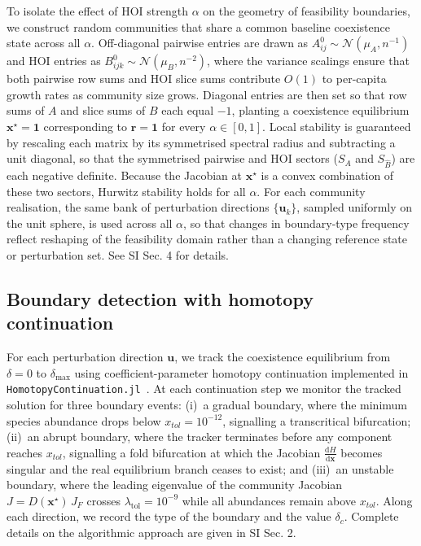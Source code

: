 \documentclass[
 reprint,
 amsmath,
 amssymb,
 aps,
 superscriptaddress,
]{revtex4-2}
\begin{document}
To isolate the effect of HOI strength $\alpha$ on the geometry of feasibility boundaries, we construct random communities that share a common baseline coexistence state across all $\alpha$. Off-diagonal pairwise entries are drawn as $A^0_{ij} \sim \mathcal{N}(\mu_A, n^{-1})$ and HOI entries as $B^0_{ijk} \sim \mathcal{N}(\mu_B, n^{-2})$, where the variance scalings ensure that both pairwise row sums and HOI slice sums contribute $O(1)$ to per-capita growth rates as community size grows. Diagonal entries are then set so that row sums of $A$ and slice sums of $B$ each equal $-1$, planting a coexistence equilibrium $\mathbf{x}^\star = \mathbf{1}$ corresponding to $\mathbf{r} = \mathbf{1}$ for every $\alpha \in [0,1]$. Local stability is guaranteed by rescaling each matrix by its symmetrised spectral radius and subtracting a unit diagonal, so that the symmetrised pairwise and HOI sectors ($S_A$ and $S_{\hat{B}}$) are each negative definite. Because the Jacobian at $\mathbf{x}^\star$ is a convex combination of these two sectors, Hurwitz stability holds for all $\alpha$. For each community realisation, the same bank of perturbation directions $\{\mathbf{u}_k\}$, sampled uniformly on the unit sphere, is used across all $\alpha$, so that changes in boundary-type frequency reflect reshaping of the feasibility domain rather than a changing reference state or perturbation set. See SI Sec. 4 for details.

\subsection*{Boundary detection with homotopy continuation}

For each perturbation direction $\mathbf{u}$, we track the coexistence equilibrium from $\delta = 0$ to $\delta_{\max}$ using coefficient-parameter homotopy continuation implemented in \texttt{HomotopyContinuation.jl}~\cite{breiding_homotopycontinuationjl_2018}. At each continuation step we monitor the tracked solution for three boundary events: (i)~a gradual boundary, where the minimum species abundance drops below $x_{tol} = 10^{-12}$, signalling a transcritical bifurcation; (ii)~an abrupt boundary, where the tracker terminates before any component reaches $x_{tol}$, signalling a fold bifurcation at which the Jacobian $\frac{\mathrm{d}H}{\mathrm{d}\mathbf{x}}$ becomes singular and the real equilibrium branch ceases to exist; and (iii)~an unstable boundary, where the leading eigenvalue of the community Jacobian $J = D(\mathbf{x}^\star)\,J_F$ crosses $\lambda_{\mathrm{tol}} = 10^{-9}$ while all abundances remain above $x_{tol}$. Along each direction, we record the type of the boundary and the value $\delta_c$. Complete details on the algorithmic approach are given in SI Sec. 2.
\end{document}
